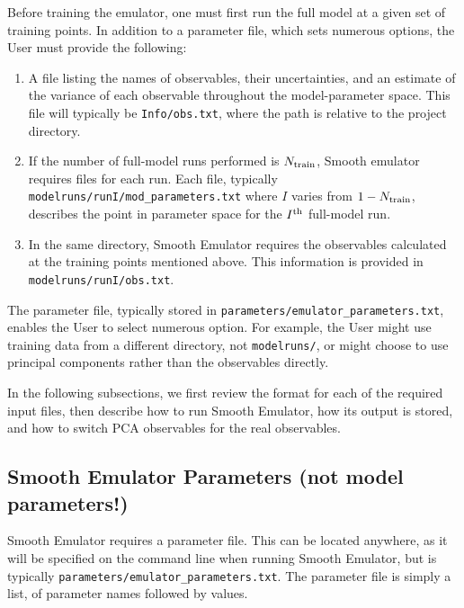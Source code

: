 \documentclass[main.tex]{subfiles}
\begin{document}
Before training the emulator, one must first run the full model at a given set of training points. In addition to a parameter file, which sets numerous options, the User must provide the following:
\begin{enumerate}\itemsep=0pt
    \item A file listing the names of observables, their uncertainties, and an estimate of the variance of each observable throughout the model-parameter space. This file will typically be {\tt Info/obs.txt}, where the path is relative to the project directory. 
    \item If the number of full-model runs performed is $N_{\rm train}$, Smooth emulator requires files for each run. Each file, typically {\tt modelruns/runI/mod\_parameters.txt} where $I$ varies from $1-N_{\rm train}$, describes the point in  parameter space for the $I^{\rm th}$ full-model run. 
    \item In the same directory, Smooth Emulator requires the observables calculated at the training points mentioned above. This information is provided in {\tt modelruns/runI/obs.txt}. 
\end{enumerate}
The parameter file, typically stored in {\tt parameters/emulator\_parameters.txt}, enables the User to select numerous option. For example, the User might use training data from a different directory, not {\tt modelruns/}, or might choose to use principal components rather than the observables directly. 

In the following subsections, we first review the format for each of the required input files, then describe how to run Smooth Emulator, how its output is stored, and how to switch PCA observables for the real observables.

\subsection{Smooth Emulator Parameters (not model parameters!)}

Smooth Emulator requires a parameter file. This can be located anywhere, as it will be specified on the command line when running Smooth Emulator, but is typically {\tt parameters/emulator\_parameters.txt}. The parameter file is simply a list, of parameter names followed by values. 
\end{document}
